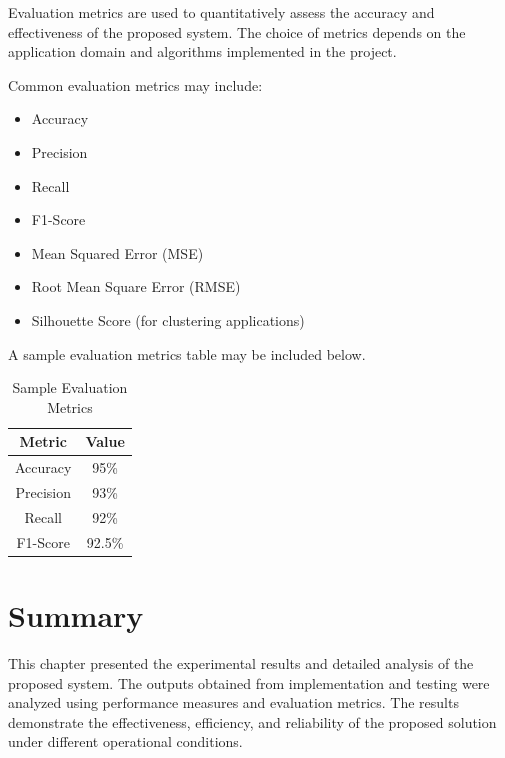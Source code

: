 Evaluation metrics are used to quantitatively assess the accuracy and effectiveness of the proposed system. The choice of metrics depends on the application domain and algorithms implemented in the project.

Common evaluation metrics may include:
\begin{itemize}
    \item Accuracy
    \item Precision
    \item Recall
    \item F1-Score
    \item Mean Squared Error (MSE)
    \item Root Mean Square Error (RMSE)
    \item Silhouette Score (for clustering applications)
\end{itemize}

A sample evaluation metrics table may be included below.

\begin{table}[htb]
\centering
\caption{Sample Evaluation Metrics}
\label{tab:evaluation_metrics}
\begin{tabular}{|c|c|}
\hline
\textbf{Metric} & \textbf{Value} \\
\hline
Accuracy & 95\% \\
\hline
Precision & 93\% \\
\hline
Recall & 92\% \\
\hline
F1-Score & 92.5\% \\
\hline
\end{tabular}
\end{table}


\section{Summary}

This chapter presented the experimental results and detailed analysis of the proposed system. The outputs obtained from implementation and testing were analyzed using performance measures and evaluation metrics. The results demonstrate the effectiveness, efficiency, and reliability of the proposed solution under different operational conditions.